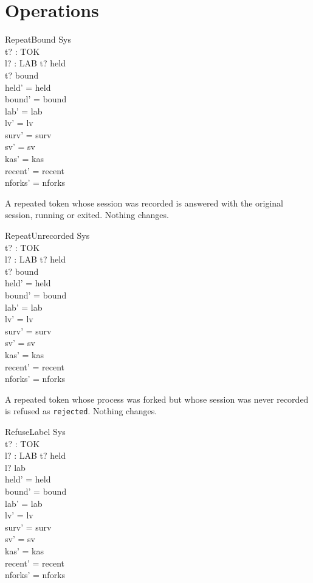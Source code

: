 \documentclass[a4paper,10pt,fleqn]{article}
\begin{document}
\section{Operations}

\begin{schema}{RepeatBound}
  \Delta Sys \\
  t? : TOK \\ l? : LAB
\where
  t? \in \dom held \\
  t? \in bound \\
  held' = held \\
  bound' = bound \\
  lab' = lab \\
  lv' = lv \\
  surv' = surv \\
  sv' = sv \\
  kas' = kas \\
  recent' = recent \\
  nforks' = nforks
\end{schema}

A repeated token whose session was recorded is answered with the original session, running or exited. Nothing changes.

\begin{schema}{RepeatUnrecorded}
  \Delta Sys \\
  t? : TOK \\ l? : LAB
\where
  t? \in \dom held \\
  t? \notin bound \\
  held' = held \\
  bound' = bound \\
  lab' = lab \\
  lv' = lv \\
  surv' = surv \\
  sv' = sv \\
  kas' = kas \\
  recent' = recent \\
  nforks' = nforks
\end{schema}

A repeated token whose process was forked but whose session was never recorded is refused as \texttt{rejected}. Nothing changes.

\begin{schema}{RefuseLabel}
  \Delta Sys \\
  t? : TOK \\ l? : LAB
\where
  t? \notin \dom held \\
  l? \in \dom lab \\
  held' = held \\
  bound' = bound \\
  lab' = lab \\
  lv' = lv \\
  surv' = surv \\
  sv' = sv \\
  kas' = kas \\
  recent' = recent \\
  nforks' = nforks
\end{schema}
\end{document}
